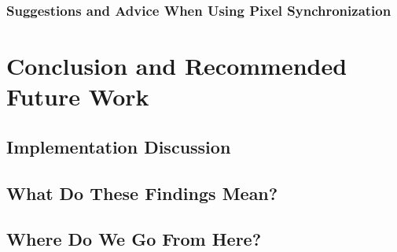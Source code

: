 \documentclass[a4paper, 12pt]{article}
\begin{document}
\subsubsection{Suggestions and Advice When Using Pixel Synchronization}

\lipsum[100-114]

\pagebreak

\section{Conclusion and Recommended Future Work}

\lipsum[115-119]

\subsection{Implementation Discussion}
\label{subsection:Implementation}

\lipsum[120-150]

\subsection{What Do These Findings Mean?}

\lipsum[1-19]

\subsection{Where Do We Go From Here?}

\lipsum[20-75]
\end{document}
